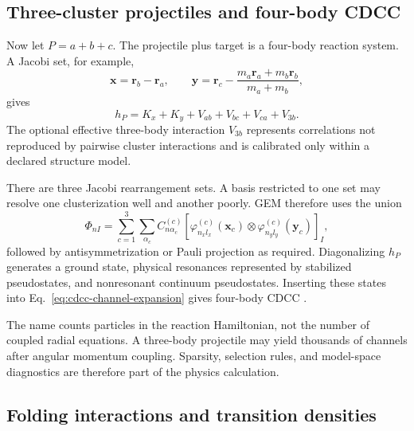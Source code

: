 \subsection{Three-cluster projectiles and four-body CDCC}
\label{subsec:four-body-cdcc}

Now let $P=a+b+c$.  The projectile plus target is a four-body reaction
system.  A Jacobi set, for example,
\begin{equation}
  \bm x=\bm r_b-\bm r_a,
  \qquad
  \bm y=\bm r_c-
  \frac{m_a\bm r_a+m_b\bm r_b}{m_a+m_b},
  \label{eq:three-cluster-jacobi}
\end{equation}
gives
\begin{equation}
  h_P=K_x+K_y+V_{ab}+V_{bc}+V_{ca}+V_{3b}.
  \label{eq:three-cluster-projectile-H}
\end{equation}
The optional effective three-body interaction $V_{3b}$ represents correlations
not reproduced by pairwise cluster interactions and is calibrated only within
a declared structure model.

There are three Jacobi rearrangement sets.  A basis restricted to one set may
resolve one clusterization well and another poorly.  GEM therefore uses the
union
\begin{equation}
  \Phi_{nI}=
  \sum_{c=1}^{3}\sum_{\alpha_c}
  C_{n\alpha_c}^{(c)}
  \left[
  \varphi_{n_xl_x}^{(c)}(\bm x_c)
  \otimes
  \varphi_{n_yl_y}^{(c)}(\bm y_c)
  \right]_{I},
  \label{eq:gem-rearrangement-expansion}
\end{equation}
followed by antisymmetrization or Pauli projection as required.  Diagonalizing
$h_P$ generates a ground state, physical resonances represented by stabilized
pseudostates, and nonresonant continuum pseudostates.  Inserting these states
into Eq.~\eqref{eq:cdcc-channel-expansion} gives four-body CDCC
\cite{Matsumoto2004FourBodyCDCC,Matsumoto:2010mi}.

The name counts particles in the reaction Hamiltonian, not the number of
coupled radial equations.  A three-body projectile may yield thousands of
channels after angular momentum coupling.  Sparsity, selection rules, and
model-space diagnostics are therefore part of the physics calculation.

\subsection{Folding interactions and transition densities}
\label{subsec:cdcc-folding}

